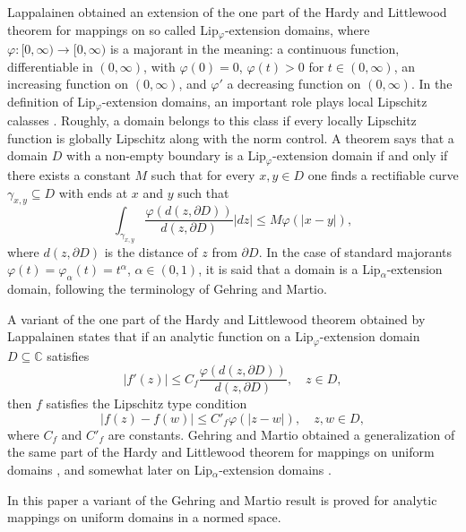 \documentclass{amsart}
\theoremstyle{definition}
\numberwithin{equation}{section}
\begin{document}
Lappalainen \cite{LAPPALAINEN.AASF} obtained an extension of the one part of the Hardy and Littlewood theorem for
mappings on so called  Lip$_\varphi$-extension domains, where $\varphi:[0,\infty)\to [0,\infty)$ is a majorant
in the meaning: a continuous function, differentiable in $(0,\infty)$, with $\varphi (0) = 0$, $\varphi (t)>0$ for
$t\in (0,\infty)$, an increasing function on $(0,\infty)$, and $\varphi'$ a decreasing function on $(0,\infty)$.
In the definition of Lip$_\varphi$-extension domains, an important role plays local Lipschitz calasses
\cite{LAPPALAINEN.AASF}. Roughly, a domain belongs to this class if every locally Lipschitz function is globally
Lipschitz along with the norm control. A theorem says that a domain $D$ with a non-empty boundary is a
Lip$_\varphi$-extension domain if and only if there exists a constant $M$ such that for every $x, y\in D$ one finds
a rectifiable curve $\gamma_{x,y}\subseteq D$ with ends at $x$ and $y$ such that
\begin{equation}\label{EQ.LAPPALAINEN.COND}
\int _{\gamma_{x,y}} \frac{\varphi (d(z,\partial D))}{d(z,\partial D)} |dz|  \le M  \varphi ( |x-y|),
\end{equation}
where $d(z,\partial D)$  is the distance of $z$ from $\partial  D$. In the case of standard majorants
$\varphi(t) = \varphi_\alpha (t)=t^\alpha$, $\alpha\in (0,1)$, it is said that a domain is a Lip$_\alpha$-extension
domain, following the terminology of Gehring and Martio.

A variant of the one part of the Hardy and Littlewood theorem obtained by Lappalainen
\cite[Theorem 7.3]{LAPPALAINEN.AASF} states that if an analytic function on a Lip$_\varphi$-extension domain
$D\subseteq \mathbb{C}$ satisfies
\begin{equation}\label{EQ.LAPPALAINEN.1}
| f'(z) |\le  C_f\frac{\varphi (d (z,\partial D))}{d(z,\partial D)},\quad  z\in D,
\end{equation}
then $f$ satisfies the Lipschitz type condition
\begin{equation}\label{EQ.LAPPALAINEN.2}
|f(z) - f (w)| \le C'_f \varphi ( |z-w|),\quad z,w\in D,
\end{equation}
where $ C_f$ and $ C'_f$  are constants. Gehring and Martio obtained a generalization of the same part of the Hardy
and Littlewood theorem  for mappings on uniform domains \cite{GEHRING.CV}, and somewhat later on Lip$_\alpha$-extension
domains \cite{GEHRING.AASF}.

In this paper a variant of the Gehring and Martio result is proved for analytic mappings on uniform domains in a normed
space.
\end{document}
